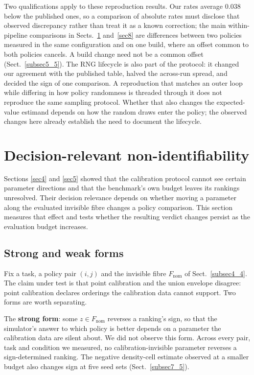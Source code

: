 \documentclass[pdflatex,iicol,sn-apa]{sn-jnl}
\theoremstyle{remark}
\begin{document}
Two qualifications apply to these reproduction results. Our rates average $0.038$ below the published
ones, so a comparison of absolute rates must disclose that observed discrepancy rather than treat it
as a known correction; the main within-pipeline comparisons in Sects.~\ref{sec7} and~\ref{sec8} are differences between two
policies measured in the same configuration and on one build, where an offset common to both
policies cancels. A build change need not be a common offset (Sect.~\ref{subsec5_5}). The RNG lifecycle is
also part of the protocol: it changed our agreement with the
published table, halved the across-run spread, and decided the sign of one comparison. A reproduction
that matches an outer loop while differing in how policy randomness is threaded through it does
not reproduce the same sampling protocol. Whether that also changes the expected-value estimand
depends on how the random draws enter the policy; the observed changes here already establish the
need to document the lifecycle.

\section{Decision-relevant non-identifiability}\label{sec7}

Sections \ref{sec4} and \ref{sec5} showed that the calibration protocol cannot see certain parameter
directions and that the benchmark's own budget leaves its rankings unresolved. Their decision relevance depends on whether moving a parameter along the evaluated invisible fibre
changes a policy comparison. This section measures that effect and tests whether the resulting
verdict changes persist as the evaluation budget increases.

\subsection{Strong and weak forms}\label{subsec7_1}

Fix a task, a policy pair $(i,j)$ and the invisible fibre $F_{\mathrm{nom}}$ of Sect.~\ref{subsec4_4}. The
claim under test is that point calibration and the union envelope disagree: point calibration
declares orderings the calibration data cannot support. Two forms are worth separating.

The \textbf{strong form}: some $z \in F_{\mathrm{nom}}$ reverses a ranking's sign, so that the simulator's
answer to which policy is better depends on a parameter the calibration data are silent about.
We did not observe this form. Across every pair, task and condition we measured, no
calibration-invisible parameter reverses a sign-determined ranking. The negative density-cell estimate observed at a smaller budget also changes sign at five seed sets
(Sect.~\ref{subsec7_5}).
\end{document}
